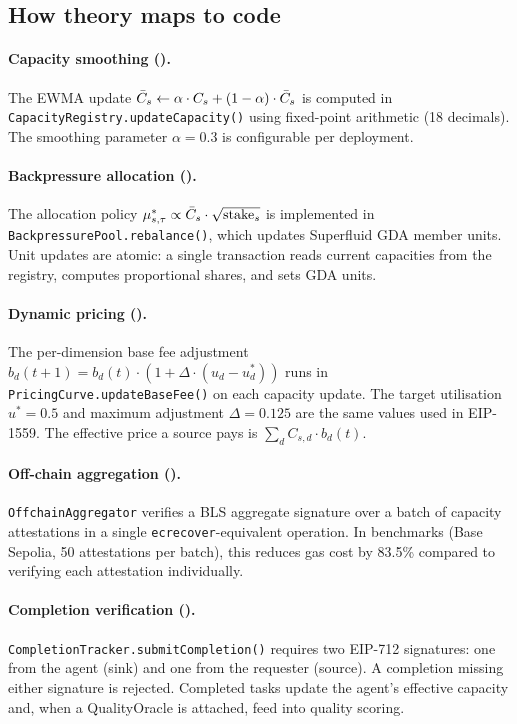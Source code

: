 \subsection{How theory maps to code}

\paragraph{Capacity smoothing ().}
The EWMA update $\bar{C}_s \leftarrow \alpha \cdot C_s + (1 - \alpha) \cdot \bar{C}_s$
is computed in \texttt{CapacityRegistry.updateCapacity()} using fixed-point arithmetic
(18 decimals). The smoothing parameter $\alpha = 0.3$ is configurable per deployment.

\paragraph{Backpressure allocation ().}
The allocation policy $\mu^*_{s,\tau} \propto \bar{C}_s \cdot \sqrt{\text{stake}_s}$
is implemented in \texttt{BackpressurePool.rebalance()}, which updates Superfluid GDA
member units. Unit updates are atomic: a single transaction reads current capacities
from the registry, computes proportional shares, and sets GDA units.

\paragraph{Dynamic pricing ().}
The per-dimension base fee adjustment
$b_d(t+1) = b_d(t) \cdot (1 + \Delta \cdot (u_d - u^*_d))$
runs in \texttt{PricingCurve.updateBaseFee()} on each capacity update. The
target utilisation $u^* = 0.5$ and maximum adjustment $\Delta = 0.125$ are
the same values used in EIP-1559. The effective price a source pays is
$\sum_d C_{s,d} \cdot b_d(t)$.

\paragraph{Off-chain aggregation ().}
\texttt{OffchainAggregator} verifies a BLS aggregate signature over a batch of
capacity attestations in a single \texttt{ecrecover}-equivalent operation. In
benchmarks (Base Sepolia, 50 attestations per batch), this reduces gas cost by
83.5\% compared to verifying each attestation individually.

\paragraph{Completion verification ().}
\texttt{CompletionTracker.submitCompletion()} requires two EIP-712 signatures:
one from the agent (sink) and one from the requester (source). A completion
missing either signature is rejected. Completed tasks update the agent's
effective capacity and, when a QualityOracle is attached, feed into quality
scoring.

